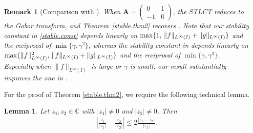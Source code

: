 \documentclass[11pt, reqno]{amsart}
\newtheorem{lemma}[theorem]{Lemma}%
\newtheorem{remark}[theorem]{Remark}%
\newcommand{\C}{\mathbb{C}}
\numberwithin{equation}{section}
\begin{document}


    


\begin{remark}[Comparison with \cite{grohs2024stable}]
    When $\mathbf{A} = \begin{pmatrix} 0 & 1 \\ -1 & 0 \end{pmatrix}$, the STLCT reduces to the Gabor transform, and Theorem~\ref{stable.thm2} recovers \cite[Theorem 3.10]{grohs2024stable}.
    Note that our stability constant in \eqref{stable.const} depends linearly on ${\rm max}\{1,\, \|f\|_{L^{\infty} (I)} + \|g\|_{L^{\infty} (I)}\}$ and the reciprocal of $\min \{\gamma, \gamma^2\}$, whereas the stability constant in \cite[Eq.(27)]{grohs2024stable} depends linearly on ${\rm max}\{\|f\|_{L^{\infty}(I)}^2,\, \|f\|_{L^{\infty} (I)} + \|g\|_{L^{\infty} (I)}\}$ and the reciprocal of $\min \{\gamma, \gamma^3\}$. Especially when $\|f\|_{L^{\infty} (I)}$ is large or $\gamma$ is small, our result substantially improves the one in \cite{grohs2024stable}.
\end{remark}





 

For the proof of Theorem \ref{stable.thm2}, we require the following technical   lemma. 

\begin{lemma}\label{prop1}
    Let $z_1, z_2 \in \C$ with $|z_1|\ne 0$ and $|z_2|\ne 0$. Then
    \begin{align*}
        \left| \frac{z_1}{|z_1|} - \frac{z_2}{|z_2|} \right| \le 2\frac{|z_1 - z_2|}{|z_1|}.
    \end{align*}
\end{lemma}
\end{document}
